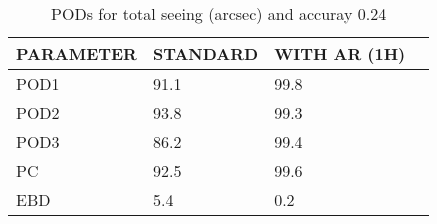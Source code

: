 \begin{table}[]
\begin{center}
\begin{tabular}{|l|l|l|l|}
\hline
\multicolumn{1}{|c|}{\cellcolor[HTML]{C0C0C0}\textbf{PARAMETER}} & \multicolumn{1}{c|}{\cellcolor[HTML]{C0C0C0}\textbf{STANDARD}} & \multicolumn{1}{c|}{\cellcolor[HTML]{C0C0C0}\textbf{WITH AR (1H)}} \\
\hline
\cellcolor[HTML]{C0C0C0}POD1  & 91.1                                & 99.8         \\
\cellcolor[HTML]{C0C0C0}POD2  & 93.8                                & 99.3         \\
\cellcolor[HTML]{C0C0C0}POD3  & 86.2                                & 99.4         \\
\cellcolor[HTML]{C0C0C0}PC    & 92.5                                  & 99.6           \\
\cellcolor[HTML]{C0C0C0}EBD   & 5.4                                 & 0.2          \\
\hline
\end{tabular}
\caption{PODs for total seeing (arcsec) and accuray 0.24}
\end{center}
\end{table}
